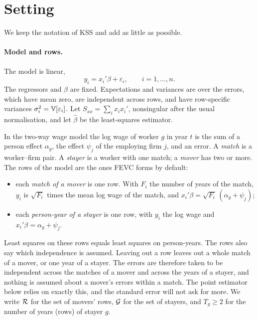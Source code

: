 \section{Setting}\label{sec:setting}

We keep the notation of KSS and add as little as possible.

\paragraph{Model and rows.} The model is linear,
\[
y_i = x_i'\beta + \varepsilon_i, \qquad i=1,\dots,n .
\]
The regressors and $\beta$ are fixed. Expectations and variances are over the errors, which have mean zero, are
independent across rows, and have row-specific variances $\sigma_i^2=\mathbb{V}[\varepsilon_i]$. Let
$S_{xx}=\sum_ix_ix_i'$, nonsingular after the usual normalisation, and let $\hat\beta$ be the least-squares
estimator.

In the two-way wage model the log wage of worker $g$ in year $t$ is the sum of a person effect $\alpha_g$, the
effect $\psi_j$ of the employing firm $j$, and an error. A \emph{match} is a worker--firm pair. A \emph{stayer}
is a worker with one match; a \emph{mover} has two or more. The rows of the model are the ones FEVC forms by
default:
\begin{itemize}
\item each \emph{match of a mover} is one row. With $F_i$ the number of years of the match, $y_i$ is $\sqrt{F_i}$
times the mean log wage of the match, and $x_i'\beta=\sqrt{F_i}\,(\alpha_g+\psi_j)$;
\item each \emph{person-year of a stayer} is one row, with $y_i$ the log wage and $x_i'\beta=\alpha_g+\psi_j$.
\end{itemize}
Least squares on these rows equals least squares on person-years. The rows also say which independence is
assumed. Leaving out a row leaves out a whole match of a mover, or one year of a stayer. The errors are
therefore taken to be independent across the matches of a mover and across the years of a stayer, and nothing
is assumed about a mover's errors within a match. The point estimator below relies on exactly this, and the
standard error will not ask for more. We write $\mathcal{R}$ for the set of movers' rows, $\mathcal{G}$ for the set of stayers,
and $T_g\ge2$ for the number of years (rows) of stayer $g$.

